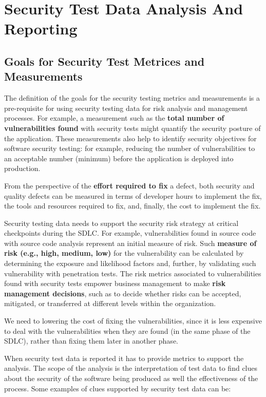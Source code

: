 	\clearpage
	\section{Security Test Data Analysis And Reporting}

	\subsection{Goals for Security Test Metrices and Measurements}
		The definition of the goals for the security testing metrics and measurements is a pre-requisite 
		for using security testing data for risk analysis and management processes. For example, a 
		measurement such as the {\bf total number of vulnerabilities found} with security tests might quantify 
		the security posture of the application. These measurements also help to identify security 
		objectives for software security testing: for example, reducing the number of vulnerabilities to 
		an acceptable number (minimum) before the application is deployed into production.

		From the perspective of the {\bf effort required to fix} a defect, both security and quality defects 
		can be measured in terms of developer hours to implement the fix, the tools and resources required 
		to fix, and, finally, the cost to implement the fix.

		Security testing data needs to support the security risk strategy at critical checkpoints during 
		the SDLC. For example, vulnerabilities found in source code with source code analysis represent 
		an initial measure of risk. Such {\bf measure of risk (e.g., high, medium, low)} for the vulnerability 
		can be calculated by determining the exposure and likelihood factors and, further, by validating 
		such vulnerability with penetration tests. The risk metrics associated to vulnerabilities found 
		with security tests empower business management to make {\bf risk management decisions}, such as to 
		decide whether risks can be accepted, mitigated, or transferred at different levels within the 
		organization.

		We need to lowering the cost of fixing the vulnerabilities, since it is less expensive to deal with the 
		vulnerabilities when they are found (in the same phase of the SDLC), rather than fixing them 
		later in another phase.

		When security test data is reported it has to provide metrics to support the analysis. The scope 
		of the analysis is the interpretation of test data to find clues about the security of the software 
		being produced as well the effectiveness of the process. Some examples of clues supported by security 
		test data can be:


